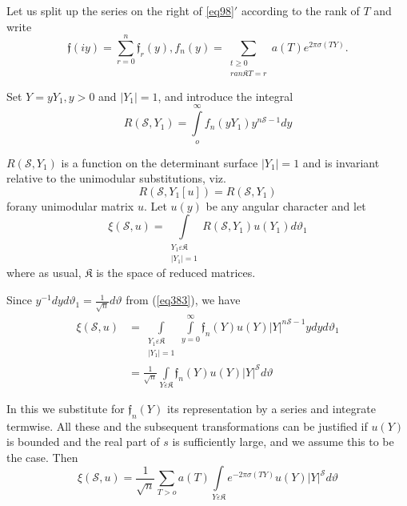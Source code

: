  Let us split up the series on the right of \ref{eq98}$'$ according to the
 rank of $T$ and write 
 $$
 \mathfrak{f} (i y)= \sum^n_{r=0} \mathfrak{f}_r (y), f_n (y)
 =\sum_{\substack{t \ge 0 \\ r a n \mathfrak{K} T = r }} a (T) e ^{2
   \pi \sigma (T Y)}.  
 $$
 
 Set $Y = y Y_1, y > 0$ and $|Y_1| = 1$, and introduce the integral 
 \begin{equation*}
R (\mathscr{S}, Y_1) = \int\limits_o^\infty f_n (y Y_1) y^{n \mathscr{S}-1}
dy \tag{415}\label{eq415} 
 \end{equation*} 
 
 $R (\mathscr{S}, Y_1)$ is a function on the determinant surface $|Y_1|
 =1$ and is invariant relative to the unimodular substitutions, viz. 
 $$
 R(\mathscr{S}, Y_1 [u]) = R (\mathscr{S}, Y_1)
 $$
 for\pageoriginale any unimodular matrix $u$. Let $u(y)$ be any
 angular character  and let   
 \begin{equation*}
\xi (\mathscr{S}, u) =\int\limits_{\substack{Y_1 \varepsilon
    \mathfrak{K}\\ |Y_1|= 1}} R (\mathscr{S}, Y_1) u (Y_1) d\vartheta_1
\tag{416}\label{eq416} 
 \end{equation*} 
 where as usual, $\mathfrak{K}$ is the space of reduced matrices.  
 
 Since $y^{-1} dy d \vartheta_1 = \frac{1}{\sqrt{n}} d \vartheta$ from
(\ref{eq383}), we have
 \begin{align*}
\xi (\mathscr{S}, u) &  = \int\limits_{\substack{Y_1 \varepsilon
    \mathfrak{K} \\ |Y_1| = 1}} \int\limits_{y =0}^\infty \mathfrak{f}_n
(Y) u (Y)|Y|^{ n \mathscr{S} -1} y dy d \vartheta_1\\ 
 & = \frac{1}{\sqrt{n}} \int\limits_{Y \varepsilon \mathfrak{K}}
\mathfrak{f}_n (Y) u (Y) |Y|^\mathscr{S} d  \vartheta 
 \end{align*}
 
 In this we substitute for $\mathfrak{f}_n (Y)$ its representation by a
 series and integrate termwise.  All these and the subsequent
 transformations can be justified if $u (Y)$ is bounded and the real
 part of $s$ is sufficiently large, and we assume this to be
 the case. Then    
 \begin{equation*}
\xi (\mathscr{S}, u) = \frac{1}{\sqrt{n}} \sum_{T > o} a (T)
\int\limits_{Y \varepsilon \mathfrak{K}} e ^{- 2 \pi \sigma (T Y)} u (Y)
|Y|^\mathscr{S} d \vartheta \tag{417}\label{eq417} 
 \end{equation*} 
 
